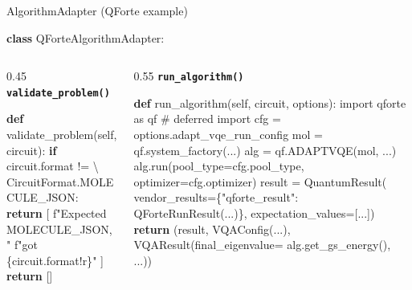 \documentclass[
  ignorenonframetext,
  aspectratio=169,
]{beamer}
\newenvironment{Shaded}{\begin{snugshade}}{\end{snugshade}}
\newcommand{\BuiltInTok}[1]{\textcolor[rgb]{0.50,0.55,0.55}{#1}}
\newcommand{\CommentTok}[1]{\textcolor[rgb]{0.48,0.49,0.49}{#1}}
\newcommand{\ControlFlowTok}[1]{\textcolor[rgb]{0.99,0.74,0.29}{\textbf{#1}}}
\newcommand{\ImportTok}[1]{\textcolor[rgb]{0.15,0.68,0.38}{#1}}
\newcommand{\KeywordTok}[1]{\textcolor[rgb]{0.81,0.81,0.76}{\textbf{#1}}}
\newcommand{\NormalTok}[1]{\textcolor[rgb]{0.81,0.81,0.76}{#1}}
\newcommand{\OperatorTok}[1]{\textcolor[rgb]{0.81,0.81,0.76}{#1}}
\newcommand{\SpecialCharTok}[1]{\textcolor[rgb]{0.24,0.68,0.91}{#1}}
\newcommand{\SpecialStringTok}[1]{\textcolor[rgb]{0.85,0.27,0.33}{#1}}
\newcommand{\StringTok}[1]{\textcolor[rgb]{0.96,0.31,0.31}{#1}}
\newcommand{\VariableTok}[1]{\textcolor[rgb]{0.15,0.68,0.68}{#1}}
\begin{document}
\begin{frame}[fragile]{AlgorithmAdapter (QForte example)}
\label{algorithmadapter-qforte-example}
\footnotesize

\begin{Shaded}
\begin{Highlighting}[]
\KeywordTok{class}\NormalTok{ QForteAlgorithmAdapter:}
\end{Highlighting}
\end{Shaded}

\begin{columns}[T]
\begin{column}{0.45\textwidth}
\textbf{\texttt{validate\_problem()}}

\begin{Shaded}
\begin{Highlighting}[]
\KeywordTok{def}\NormalTok{ validate\_problem(}\VariableTok{self}\NormalTok{, circuit):}
    \ControlFlowTok{if}\NormalTok{ circuit.}\BuiltInTok{format} \OperatorTok{!=} \OperatorTok{\textbackslash{}}
\NormalTok{            CircuitFormat.MOLECULE\_JSON:}
        \ControlFlowTok{return}\NormalTok{ [}
            \SpecialStringTok{f"Expected MOLECULE\_JSON, "}
            \SpecialStringTok{f"got }\SpecialCharTok{\{}\NormalTok{circuit}\SpecialCharTok{.}\BuiltInTok{format}\SpecialCharTok{!r\}}\SpecialStringTok{"}
\NormalTok{        ]}
    \ControlFlowTok{return}\NormalTok{ []}
\end{Highlighting}
\end{Shaded}
\end{column}

\begin{column}{0.55\textwidth}
\textbf{\texttt{run\_algorithm()}}

\begin{Shaded}
\begin{Highlighting}[]
\KeywordTok{def}\NormalTok{ run\_algorithm(}\VariableTok{self}\NormalTok{, circuit, options):}
    \ImportTok{import}\NormalTok{ qforte }\ImportTok{as}\NormalTok{ qf    }\CommentTok{\# deferred import}
\NormalTok{    cfg }\OperatorTok{=}\NormalTok{ options.adapt\_vqe\_run\_config}
\NormalTok{    mol }\OperatorTok{=}\NormalTok{ qf.system\_factory(...)}
\NormalTok{    alg }\OperatorTok{=}\NormalTok{ qf.ADAPTVQE(mol, ...)}
\NormalTok{    alg.run(pool\_type}\OperatorTok{=}\NormalTok{cfg.pool\_type,}
\NormalTok{            optimizer}\OperatorTok{=}\NormalTok{cfg.optimizer)}
\NormalTok{    result }\OperatorTok{=}\NormalTok{ QuantumResult(}
\NormalTok{        vendor\_results}\OperatorTok{=}\NormalTok{\{}\StringTok{"qforte\_result"}\NormalTok{:}
\NormalTok{            QForteRunResult(...)\},}
\NormalTok{        expectation\_values}\OperatorTok{=}\NormalTok{[...])}
    \ControlFlowTok{return}\NormalTok{ (result, VQAConfig(...),}
\NormalTok{        VQAResult(final\_eigenvalue}\OperatorTok{=}
\NormalTok{            alg.get\_gs\_energy(), ...))}
\end{Highlighting}
\end{Shaded}
\end{column}
\end{columns}

\normalsize
\end{frame}
\end{document}
